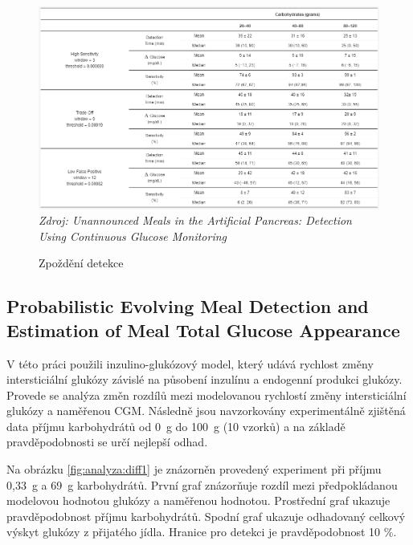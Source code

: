 \begin{figure}[H]
\caption{Zpoždění detekce}
\label{fig:analyza:crosscovariance3}
\includegraphics[width=1\textwidth]{img/analyzaCHO/crosscovariance3.png}\\
\textit{Zdroj: Unannounced Meals in the Artificial Pancreas: Detection Using Continuous Glucose Monitoring \citep{analyzaCHO.CrossCovariance}}
\end{figure}


\subsection{Probabilistic Evolving Meal Detection and Estimation of Meal Total Glucose Appearance}
\label{ch:analyzaCHO:diff}

V této práci \citet{analyzaCHO.Diff} použili inzulino-glukózový model, který udává rychlost změny intersticiální glukózy závislé na působení inzulínu a endogenní produkci glukózy. Provede se analýza změn rozdílů mezi modelovanou rychlostí změny intersticiální glukózy a naměřenou CGM. Následně jsou navzorkovány experimentálně zjištěná data příjmu karbohydrátů od 0~g do 100~g (10 vzorků) a na základě pravděpodobnosti se určí nejlepší odhad.

Na obrázku \ref{fig:analyza:diff1} je znázorněn provedený experiment při příjmu 0,33~g a 69~g karbohydrátů. První graf znázorňuje rozdíl mezi předpokládanou modelovou hodnotou glukózy a naměřenou hodnotou. Prostřední graf ukazuje pravděpodobnost příjmu karbohydrátů. Spodní graf ukazuje odhadovaný celkový výskyt glukózy z přijatého jídla. Hranice pro detekci je pravděpodobnost 10 \%.

